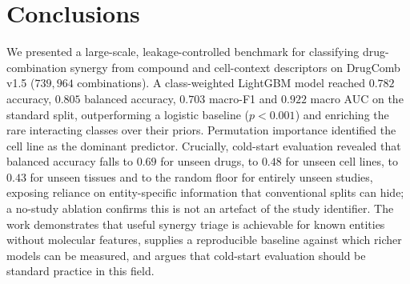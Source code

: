 \documentclass{bmcart}
\begin{document}
\section*{Conclusions}
We presented a large-scale, leakage-controlled benchmark for classifying drug-combination synergy from
compound and cell-context descriptors on DrugComb v1.5 ($739{,}964$ combinations). A class-weighted
LightGBM model reached $0.782$ accuracy, $0.805$ balanced accuracy, $0.703$ macro-F1 and $0.922$ macro
AUC on the standard split, outperforming a logistic baseline ($p<0.001$) and enriching the rare
interacting classes over their priors. Permutation importance identified the cell line as the dominant
predictor. Crucially, cold-start evaluation revealed that balanced accuracy falls to $0.69$ for unseen
drugs, to $0.48$ for unseen cell lines, to $0.43$ for unseen tissues and to the random floor for
entirely unseen studies, exposing reliance on entity-specific information that conventional splits can
hide; a no-study ablation confirms this is not an artefact of the study identifier. The work demonstrates that useful synergy triage is achievable for known
entities without molecular features, supplies a reproducible baseline against which richer models can
be measured, and argues that cold-start evaluation should be standard practice in this field.
\end{document}
